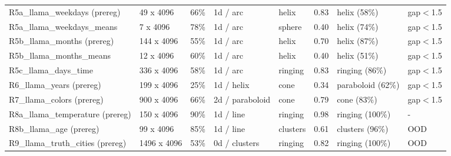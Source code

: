 \begin{tabular}{llllllll}
R5a\_llama\_weekdays (prereg) & 49 x 4096 & 66\% & 1d / arc & helix & 0.83 & helix (58\%) & gap$<$1.5 \\
R5a\_llama\_weekdays\_means & 7 x 4096 & 78\% & 1d / arc & sphere & 0.40 & helix (74\%) & gap$<$1.5 \\
R5b\_llama\_months (prereg) & 144 x 4096 & 55\% & 1d / arc & helix & 0.70 & helix (87\%) & gap$<$1.5 \\
R5b\_llama\_months\_means & 12 x 4096 & 60\% & 1d / arc & helix & 0.40 & helix (51\%) & gap$<$1.5 \\
R5c\_llama\_days\_time & 336 x 4096 & 58\% & 1d / arc & ringing & 0.83 & ringing (86\%) & gap$<$1.5 \\
R6\_llama\_years (prereg) & 199 x 4096 & 25\% & 1d / helix & cone & 0.34 & paraboloid (62\%) & gap$<$1.5 \\
R7\_llama\_colors (prereg) & 900 x 4096 & 66\% & 2d / paraboloid & cone & 0.79 & cone (83\%) & gap$<$1.5 \\
R8a\_llama\_temperature (prereg) & 150 x 4096 & 90\% & 1d / line & ringing & 0.98 & ringing (100\%) & - \\
R8b\_llama\_age (prereg) & 99 x 4096 & 85\% & 1d / line & clusters & 0.61 & clusters (96\%) & OOD \\
R9\_llama\_truth\_cities (prereg) & 1496 x 4096 & 53\% & 0d / clusters & ringing & 0.82 & ringing (100\%) & OOD \\
\bottomrule
\end{tabular}
